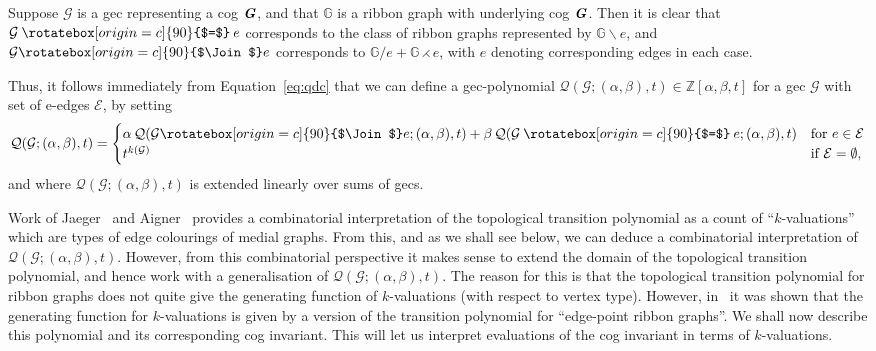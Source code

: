 \documentclass{amsart}
\newcommand{\bG}{\mathbb{G}}
\newcommand{\E}{\mathcal{E}}
\newcommand{\Q}{\mathcal{Q}}
\newcommand{\gec}[1]{\mathcal{#1}}
\newcommand{\cog}[1]{\textbf{\textit #1}}
\newcommand{\hsplice}{\rotatebox[origin=c]{90}{$\Join$}}
\newcommand{\vsplice}{\mathbin{\rotatebox[origin=c]{90}{$=$}}}
\newcommand{\ba}{\mathbin{\backslash}}
\newcommand{\tcon}{\mathbin{\rightthreetimes}}
\theoremstyle{definition}
\theoremstyle{remark}
\numberwithin{equation}{section}
\begin{document}
\medskip

Suppose $\gec{G}$ is a gec representing a cog $\cog{G}$, and that $\bG$ is a ribbon graph with underlying cog $\cog{G}$.  Then it is clear that 
   $\gec{G} \vsplice e$ corresponds to the class of ribbon graphs represented by $\bG \ba e$, and $\gec{G} \hsplice e$ corresponds to $\bG / e +\bG \tcon  e$,  with $e$ denoting corresponding edges in each case.


Thus, it follows immediately from Equation~\eqref{eq:qdc} that we can define a gec-polynomial $\Q(\gec{G}; (\alpha,\beta),t)\in \mathbb{Z}[\alpha,\beta,t]$ for a gec $\gec{G}$ with set of e-edges $\E$, by setting
\begin{equation}\label{eq:qgeq1}
\Q(\gec{G};(\alpha,\beta),t) = 
\begin{cases}
\alpha\, \Q(\gec{G} \hsplice e;(\alpha,\beta),t) +\beta \, \Q(\gec{G} \vsplice e;(\alpha,\beta),t) & \text{for $e\in \E$}\\
t^{k(\gec{G})} & \text{if $\E=\emptyset$},
\end{cases} 
\end{equation}
and where $\Q(\gec{G};(\alpha,\beta),t)$ is extended linearly over sums of gecs.


Work of Jaeger~\cite{MR1096990} and Aigner~\cite{MR1428870} provides a combinatorial interpretation of the topological transition polynomial as a count of ``$k$-valuations'' which are types of edge colourings of medial graphs. From this, and as we shall see below, we can deduce a combinatorial interpretation of $\Q(\gec{G};(\alpha,\beta),t)$. However, from this combinatorial perspective it makes sense to extend the domain of the topological transition polynomial, and hence work with a generalisation of $\Q(\gec{G};(\alpha,\beta),t)$. The reason for this is that the topological transition polynomial for ribbon graphs does not quite give the generating function of \mbox{$k$-valuations} (with respect to vertex type). However, in~\cite[Theorem~4.1]{zbMATH07021383} it was shown that the generating function for \mbox{$k$-valuations} is given by a version of the transition polynomial for ``edge-point ribbon graphs''. We shall now describe this polynomial and its corresponding cog invariant.  This will let us interpret evaluations of the cog invariant in terms of $k$-valuations. 
\end{document}
